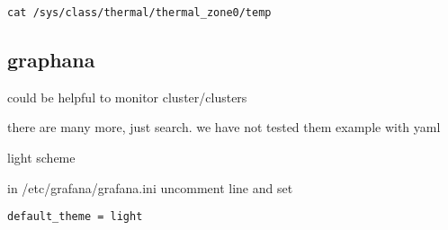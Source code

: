 \begin{lstlisting}
cat /sys/class/thermal/thermal_zone0/temp
\end{lstlisting}

\subsection{graphana}

could be helpful to monitor cluster/clusters




there are many more, just search. we have not tested them
example with yaml


light scheme

in /etc/grafana/grafana.ini uncomment line and set 

\begin{lstlisting}
default_theme = light 
\end{lstlisting}
